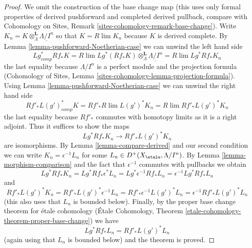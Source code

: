 \begin{proof}
We omit the construction of the base change map (this uses only
formal properties of derived pushforward and completed derived pullback,
compare with
Cohomology on Sites, Remark \ref{sites-cohomology-remark-base-change}).
Write $K_n = K \otimes^\mathbf{L}_\Lambda \underline{\Lambda/I^n}$
so that $K = R\lim K_n$ because $K$ is derived complete.
By Lemma \ref{lemma-pushforward-Noetherian-case} we can unwind the left
hand side
$$
Lg_{comp}^* Rf_* K =
R\lim Lg^*(Rf_*K)\otimes^\mathbf{L}_\Lambda \underline{\Lambda/I^n} =
R\lim Lg^* Rf_* K_n
$$
the last equality because $\Lambda/I^n$ is a perfect module and
the projection formula (Cohomology of Sites, Lemma
\ref{sites-cohomology-lemma-projection-formula}).
Using Lemma \ref{lemma-pushforward-Noetherian-case} we can unwind the right
hand side
$$
Rf'_* L(g')^*_{comp} K =
Rf'_* R\lim L(g')^* K_n  =
R\lim Rf'_* L(g')^* K_n
$$
the last equality because $Rf'_*$ commutes with homotopy limits as it is
a right adjoint. Thus it suffices to show the maps
$$
Lg^* Rf_* K_n \longrightarrow Rf'_* L(g')^* K_n
$$
are isomorphisms. By Lemma \ref{lemma-compare-derived} and our second
condition we can write $K_n = \epsilon^{-1}L_n$ for some
$L_n \in D^+(X_\etale, \Lambda/I^n)$. By Lemma \ref{lemma-morphism-comparison}
and the fact that $\epsilon^{-1}$ commutes with pullbacks
we obtain
$$
Lg^* Rf_* K_n =
Lg^* Rf_* \epsilon^*L_n =
Lg^* \epsilon^{-1} Rf_* L_n =
\epsilon^{-1} Lg^* Rf_* L_n
$$
and
$$
Rf'_* L(g')^* K_n =
Rf'_* L(g')^* \epsilon^{-1} L_n =
Rf'_* \epsilon^{-1} L(g')^* L_n =
\epsilon^{-1} Rf'_* L(g')^* L_n
$$
(this also uses that $L_n$ is bounded below).
Finally, by the proper base change theorem for \'etale cohomology
(\'Etale Cohomology, Theorem
\ref{etale-cohomology-theorem-proper-base-change}) we have
$$
Lg^* Rf_* L_n = Rf'_* L(g')^* L_n
$$
(again using that $L_n$ is bounded below)
and the theorem is proved.
\end{proof}
















